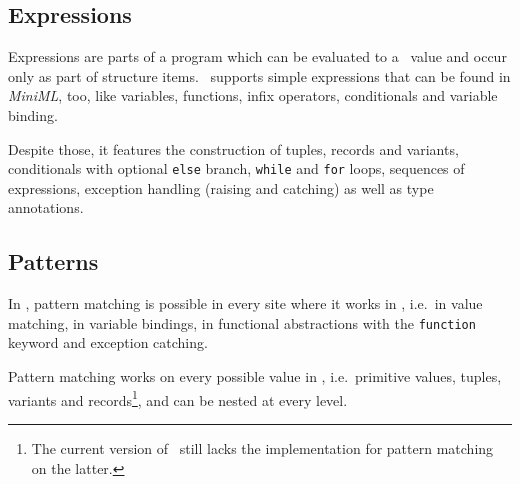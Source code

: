 \subsection*{Expressions}

Expressions are parts of a program which can be evaluated to a \ocaml\ value and
occur only as part of structure items.
\easyocaml\ supports simple expressions that can be found in \textsl{MiniML},
too, like variables, functions, infix operators, conditionals and variable
binding.

Despite those, it features the construction of tuples, records and variants,
conditionals with optional \texttt{else} branch, \texttt{while} and
\texttt{for} loops, sequences of expressions, exception handling (raising and
catching) as well as type annotations.

\subsection*{Patterns}

In \easyocaml, pattern matching is possible in every site where it works in
\ocaml, i.e.\ in value matching, in variable bindings, in
functional abstractions with the \texttt{function} keyword and exception catching.

Pattern matching works on every possible value in \easyocaml, i.e.\ primitive
values, tuples, variants and records\footnote{The current version of \easyocaml\
still lacks the implementation for pattern matching on the latter.}, and can be
nested at every
level.

